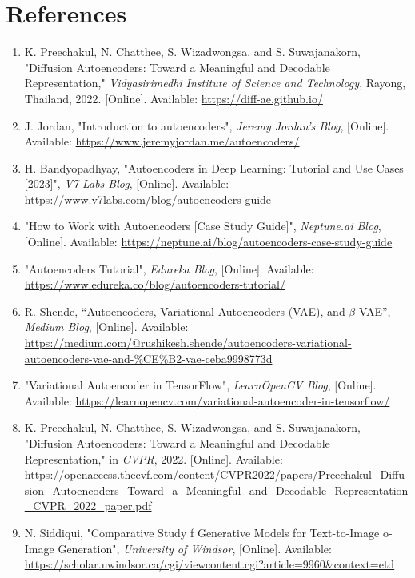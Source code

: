 \documentclass{article}
\begin{document}
		\section{References}
		\begin{enumerate}
			\item K. Preechakul, N. Chatthee, S. Wizadwongsa, and S. Suwajanakorn, "Diffusion Autoencoders: Toward a Meaningful and Decodable Representation," \textit{Vidyasirimedhi Institute of Science and Technology}, Rayong, Thailand, 2022. [Online]. Available: \url{https://diff-ae.github.io/}

			\item J. Jordan, "Introduction to autoencoders", \textit{Jeremy Jordan's 
			Blog}, [Online]. Available: \url{https://www.jeremyjordan.me/autoencoders/}

			\item H. Bandyopadhyay, "Autoencoders in Deep Learning: Tutorial and Use Cases [2023]", \textit{V7 Labs Blog}, [Online]. Available: \url{https://www.v7labs.com/blog/autoencoders-guide}

			\item "How to Work with Autoencoders [Case Study Guide]", \textit{Neptune.ai Blog}, [Online]. Available: \url{https://neptune.ai/blog/autoencoders-case-study-guide}
			
			\item "Autoencoders Tutorial", \textit{Edureka Blog}, [Online]. Available: \url{https://www.edureka.co/blog/autoencoders-tutorial/}
			
			\item R. Shende, ``Autoencoders, Variational Autoencoders (VAE), and \(\beta\)-VAE'', \textit{Medium Blog}, [Online]. Available: \url{https://medium.com/@rushikesh.shende/autoencoders-variational-autoencoders-vae-and-\%CE\%B2-vae-ceba9998773d}
			\item "Variational Autoencoder in TensorFlow", \textit{LearnOpenCV Blog}, [Online]. Available: \url{https://learnopencv.com/variational-autoencoder-in-tensorflow/}
			
			\item K. Preechakul, N. Chatthee, S. Wizadwongsa, and S. Suwajanakorn, "Diffusion Autoencoders: Toward a Meaningful and Decodable Representation," in \textit{CVPR}, 2022. [Online]. Available: \url{https://openaccess.thecvf.com/content/CVPR2022/papers/Preechakul_Diffusion_Autoencoders_Toward_a_Meaningful_and_Decodable_Representation_CVPR_2022_paper.pdf}
			
			\item N. Siddiqui, "Comparative Study f Generative Models for Text-to-Image o-Image Generation", \textit{University of Windsor}, [Online]. Available: \url{https://scholar.uwindsor.ca/cgi/viewcontent.cgi?article=9960&context=etd}
			

\end{enumerate}
\end{document}
